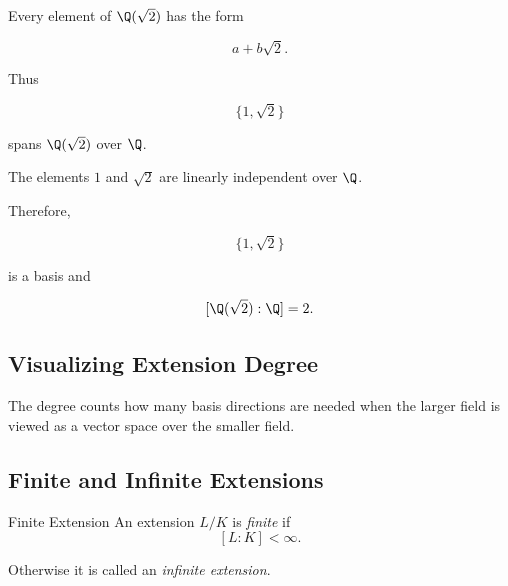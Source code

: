 Every element of \(\Q(\sqrt2)\) has the form

\[ a+b\sqrt2. \]

Thus

\[ \{1,\sqrt2\} \]

spans \(\Q(\sqrt2)\) over \(\Q\).

The elements \(1\) and \(\sqrt2\) are linearly independent over \(\Q\).

Therefore,

\[ \{1,\sqrt2\} \]

is a basis and

\[ [\Q(\sqrt2):\Q]=2. \]

\subsection{Visualizing Extension Degree}
\label{subsec:visual-extension-degree}

\begin{center}
\end{center}

The degree counts how many basis directions are needed when the larger field
is viewed as a vector space over the smaller field.

\subsection{Finite and Infinite Extensions}
\label{subsec:finite-infinite-extensions}

\begin{definitionbox}{Finite Extension}
An extension \(L/K\) is \emph{finite} if
\[ [L:K]<\infty. \]

Otherwise it is called an \emph{infinite extension}.
\end{definitionbox}

